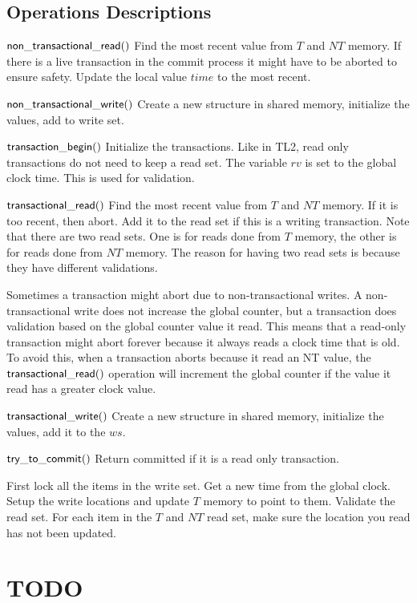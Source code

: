 \documentclass[11pt]{article}
\begin{document}
\subsection{Operations Descriptions}

{\bf ${\sf non\_transactional\_read}()$}
Find the most recent value from $T$ and $NT$ memory.
If there is a live transaction in the commit process it might have to be aborted to ensure safety.
Update the local value $time$ to the most recent.

{\bf ${\sf non\_transactional\_write}()$}
Create a new structure in shared memory, initialize the values, add to write set.


{\bf ${\sf transaction\_begin}()$}
Initialize the transactions.
Like in TL2, read only transactions do not need to keep a read set.
The variable $rv$ is set to the global clock time.
This is used for validation.

{\bf ${\sf transactional\_read}()$}
Find the most recent value from $T$ and $NT$ memory.
If it is too recent, then abort.
Add it to the read set if this is a writing transaction.
Note that there are two read sets.
One is for reads done from $T$ memory, the other is for reads done from $NT$ memory.
The reason for having two read sets is because they have different validations.

Sometimes a transaction might abort due to non-transactional writes.
A non-transactional write does not increase the global counter, but a transaction does validation based on the
global counter value it read.
This means that a read-only transaction might abort forever because it always reads a clock time that is old.
To avoid this, when a transaction aborts because it read an NT value, the ${\sf transactional\_read}()$ operation
will increment the global counter if the value it read has a greater clock value.

{\bf ${\sf transactional\_write}()$}
Create a new structure in shared memory, initialize the values, add it to the $ws$.

{\bf ${\sf try\_to\_commit}()$}
Return committed if it is a read only transaction.

First lock all the items in the write set.
Get a new time from the global clock.
Setup the write locations and update $T$ memory to point to them.
Validate the read set.
For each item in the $T$ and $NT$ read set, make sure the location you read has not been updated.

\section{TODO}
\end{document}
